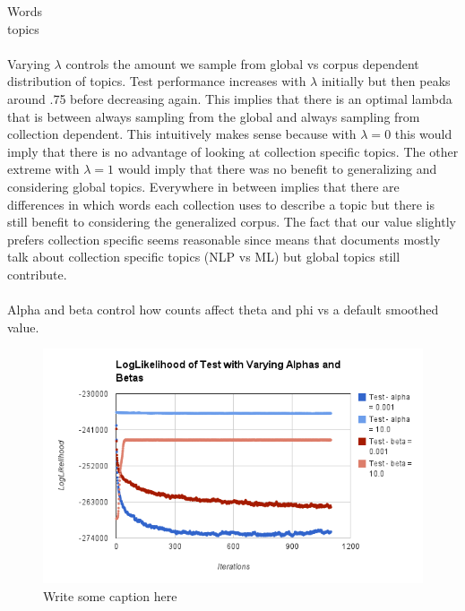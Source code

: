\documentclass[12pt]{article}
\begin{document}
 Words \\
 topics \\
\\
 Varying $\lambda$ controls the amount we sample from global vs corpus dependent distribution of topics. Test performance increases with $\lambda$ initially but then peaks around .75 before decreasing again. This implies that there is an optimal lambda that is between always sampling from the global and always sampling from collection dependent. This intuitively makes sense because with $\lambda = 0$ this would imply that there is no advantage of looking at collection specific topics. The other extreme with $\lambda=1$ would imply that there was no benefit to generalizing and considering global topics. Everywhere in between implies that there are differences in which words each collection uses to describe a topic but there is still benefit to considering the generalized corpus. The fact that our value slightly prefers collection specific seems reasonable since means that documents mostly talk about collection specific topics (NLP vs ML) but global topics still contribute. 
 \\
\\
 Alpha and  beta control how counts affect theta and phi vs a default smoothed value.  \\

\begin{figure}[H]
\centering
\includegraphics[keepaspectratio=true,scale=0.8]{charts/VaryingAlphasBetasOnTest}
\caption{Write some caption here}\label{alphaBetaVariation}
\end{figure}

\end{document}

